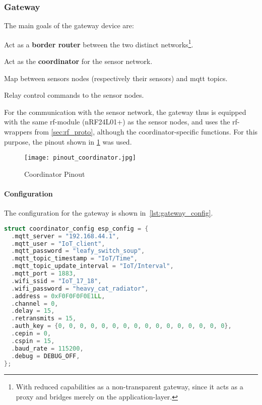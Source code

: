 \subsubsection{Gateway}
\label{sec:gateway}

The main goals of the gateway device are:
\begin{compactitem}
  \item Act as a \textbf{border router} between the two distinct networks\footnote{With reduced capabilities as a non-transparent gateway, since it acts as a proxy and bridges merely on the application-layer.}.
  \item Act as the \textbf{coordinator} for the sensor network.
  \item Map between sensors nodes (respectively their sensors) and \gls{mqtt} topics.
  \item Relay control commands to the sensor nodes.
\end{compactitem}

For the communication with the sensor network, the gateway thus is equipped with the same \gls{rf}-module (nRF24L01+) as the sensor nodes, and uses the \gls{rf}-wrappers from \cref{sec:rf_proto}, although the coordinator-specific functions. For this purpose, the pinout shown in \cref{fig:pinout_coordinator} was used.

\begin{figure}[htb]
  \centering
  \texttt{[image: pinout\_coordinator.jpg]}
  \caption{Coordinator Pinout}
  \label{fig:pinout_coordinator}
\end{figure}

\paragraph{Configuration}

The configuration for the gateway is shown in~\cref{lst:gateway_config}.

\begin{lstlisting}[language=C++,label=lst:gateway_config,caption="Config Struct for the Gateway"]
struct coordinator_config esp_config = {
  .mqtt_server = "192.168.44.1",
  .mqtt_user = "IoT_client",
  .mqtt_password = "leafy_switch_soup",
  .mqtt_topic_timestamp = "IoT/Time",
  .mqtt_topic_update_interval = "IoT/Interval",
  .mqtt_port = 1883,
  .wifi_ssid = "IoT_17_18",
  .wifi_password = "heavy_cat_radiator",
  .address = 0xF0F0F0F0E1LL,
  .channel = 0,
  .delay = 15,
  .retransmits = 15,
  .auth_key = {0, 0, 0, 0, 0, 0, 0, 0, 0, 0, 0, 0, 0, 0, 0, 0},
  .cepin = 0,
  .cspin = 15,
  .baud_rate = 115200,
  .debug = DEBUG_OFF,
};

\end{lstlisting}


